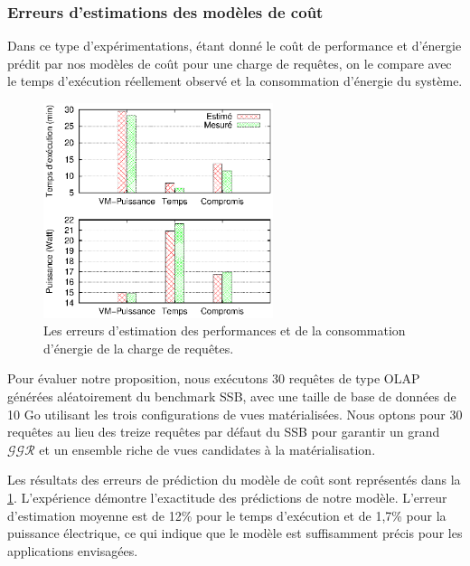 \subsubsection{Erreurs d'estimations des modèles de coût}\label{subsubsec:CostModelsError}
Dans ce type d'expérimentations, étant donné le coût de performance et d'énergie prédit par nos modèles de coût pour une charge de requêtes, on le compare avec le temps d'exécution réellement observé et la consommation d'énergie du système.
\begin{figure}
  \centering
  \includegraphics[width=0.6\textwidth]{chapitre6/chap6Fig/power-time-error.eps}
  \caption{Les erreurs d'estimation des performances et de la consommation d'énergie de la charge de requêtes.}\label{fig:power-time-error}
\end{figure}
Pour évaluer notre proposition, nous exécutons 30 requêtes de type OLAP générées aléatoirement du benchmark SSB, avec une taille de base de données de 10 Go utilisant les trois configurations de vues matérialisées. Nous optons pour 30 requêtes au lieu des treize requêtes par défaut du SSB pour garantir un grand $\mathcal{GGR}$ et un ensemble riche de vues candidates à la matérialisation.

Les résultats des erreurs de prédiction du modèle de coût sont représentés dans la \ref{fig:power-time-error}. L'expérience démontre l'exactitude des prédictions de notre modèle. L'erreur d'estimation moyenne est de 12\% pour le temps d'exécution et de 1,7\% pour la puissance électrique, ce qui indique que le modèle est suffisamment précis pour les applications envisagées.


